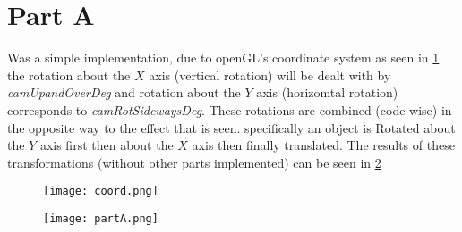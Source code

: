 \documentclass[12pt]{article}
\begin{document}
\begin{titlepage}
	

	
	
	

	 
	
	
\end{titlepage}

\tableofcontents
\newpage

\section{Part A}

Was a simple implementation, due to openGL's coordinate system as seen in \ref{fig:1}
the rotation about the \(X\) axis (vertical rotation) will be dealt with by \textit{camUpandOverDeg}
and rotation about the \(Y\) axis (horizomtal rotation) corresponds to \textit{camRotSidewaysDeg}. These rotations
are combined (code-wise) in the opposite way to the effect that is seen. specifically an object is Rotated about the \(Y\) axis first then about the \(X\) 
axis then finally translated. The results of these transformations (without other parts implemented) can be seen in 
\ref{fig:2}

\begin{figure}[]
  \centering
  \texttt{[image: coord.png]}
  \caption{}
  \label{fig:1}
\end{figure}

\begin{figure}
  \centering
  \texttt{[image: partA.png]}
  \caption{}
  \label{fig:2}
\end{figure}
\end{document}
